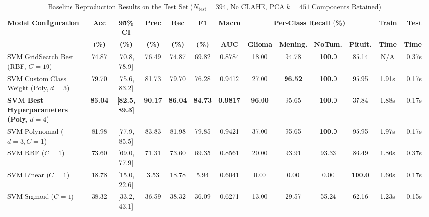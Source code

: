 \documentclass[conference]{IEEEtran}
\begin{document}
\begin{table}[t]
\centering
\caption{Baseline Reproduction Results on the Test Set ($N_{\text{test}} = 394$, No CLAHE, PCA $k = 451$ Components Retained)}
\label{tab:baseline_results}
\setlength{\tabcolsep}{4.8pt}
\begin{tabular}{lcccccccccccr}
\toprule
\multirow{2}{*}{\textbf{Model Configuration}} & \textbf{Acc} & \textbf{95\% CI} & \textbf{Prec} & \textbf{Rec} & \textbf{F1} & \textbf{Macro} & \multicolumn{4}{c}{\textbf{Per-Class Recall (\%)}} & \textbf{Train} & \textbf{Test} \\
\cmidrule(lr){8-11}
 & \textbf{(\%)} & \textbf{(\%)} & \textbf{(\%)} & \textbf{(\%)} & \textbf{(\%)} & \textbf{AUC} & \textbf{Glioma} & \textbf{Mening.} & \textbf{NoTum.} & \textbf{Pituit.} & \textbf{Time} & \textbf{Time} \\
\midrule
SVM GridSearch Best (RBF, $C=10$)      & 74.87 & [70.8, 78.9] & 76.49 & 74.87 & 69.82 & 0.8784 & 18.00 & 94.78 & \textbf{100.0} & 85.14 & N/A   & 0.37s \\
SVM Custom Class Weight (Poly, $d=3$)  & 79.70 & [75.6, 83.2] & 81.73 & 79.70 & 76.28 & 0.9412 & 27.00 & \textbf{96.52} & \textbf{100.0} & 95.95 & 1.91s & 0.17s \\
\textbf{SVM Best Hyperparameters (Poly, $d=4$)} & \textbf{86.04} & \textbf{[82.5, 89.3]} & \textbf{90.17} & \textbf{86.04} & \textbf{84.73} & \textbf{0.9817} & \textbf{96.00} & 95.65 & \textbf{100.0} & 37.84 & 1.88s & 0.17s \\
SVM Polynomial ($d=3, C=1$)            & 81.98 & [77.9, 85.5] & 83.83 & 81.98 & 79.85 & 0.9421 & 37.00 & 95.65 & \textbf{100.0} & 95.95 & 1.97s & 0.17s \\
SVM RBF ($C=1$)                        & 73.60 & [69.0, 77.9] & 71.31 & 73.60 & 69.35 & 0.8561 & 20.00 & 93.91 & 93.33 & 86.49 & 1.86s & 0.37s \\
SVM Linear ($C=1$)                     & 18.78 & [15.0, 22.6] &  3.53 & 18.78 &  5.94 & 0.6041 &  0.00 &  0.00 &  0.00 & \textbf{100.0} & 1.66s & 0.17s \\
SVM Sigmoid ($C=1$)                    & 38.32 & [33.2, 43.1] & 36.59 & 38.32 & 36.09 & 0.6271 & 13.00 & 29.57 & 55.24 & 62.16 & 1.23s & 0.15s \\
\bottomrule
\end{tabular}
\end{table}
\end{document}
